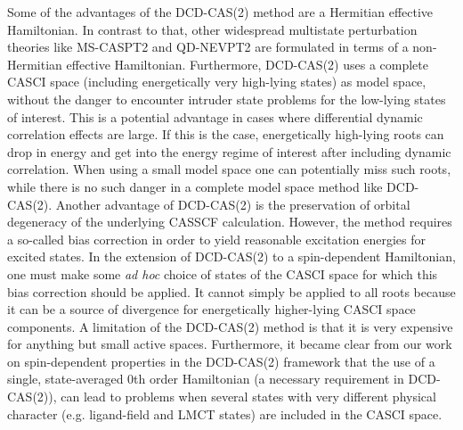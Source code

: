 Some of the advantages of the DCD-CAS(2) method are a Hermitian effective Hamiltonian. In contrast to that, other widespread multistate perturbation theories like MS-CASPT2\cite{FinleMRS_1998_299} and QD-NEVPT2\cite{AngelBCC_2004_4043} are formulated in terms of a non-Hermitian effective Hamiltonian. Furthermore, DCD-CAS(2) uses a complete CASCI space (including energetically very high-lying states) as model space, without the danger to encounter intruder state problems for the low-lying states of interest. This is a potential advantage in cases where differential dynamic correlation effects are large. If this is the case, energetically high-lying roots can drop in energy and get into the energy regime of interest after including dynamic correlation. When using a small model space one can potentially miss such roots, while there is no such danger in a complete model space method like DCD-CAS(2).
Another advantage of DCD-CAS(2) is the preservation of orbital degeneracy of the underlying CASSCF calculation. However, the method requires a so-called bias correction in order to yield reasonable excitation energies for excited states. In the extension of DCD-CAS(2) to a spin-dependent Hamiltonian,\cite{LangN_2019_104104} one must make some \textit{ad hoc} choice of states of the CASCI space for which this bias correction should be applied. It cannot simply be applied to all roots because it can be a source of divergence for energetically higher-lying CASCI space components. A limitation of the DCD-CAS(2) method is that it is very expensive for anything but small active spaces. Furthermore, it became clear from our work on spin-dependent properties in the DCD-CAS(2) framework that the use of a single, state-averaged 0th order Hamiltonian  (a necessary requirement in DCD-CAS(2)), can lead to problems when several states with very different physical character (e.g. ligand-field and LMCT states) are included in the CASCI space.\cite{LangN_2019_104104}


